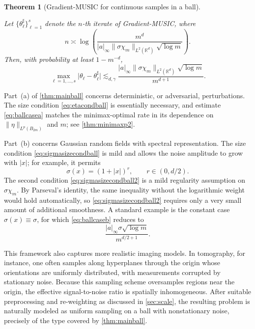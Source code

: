 \documentclass[11pt]{article}
\newtheorem{theorem}{Theorem}
\theoremstyle{definition}
\numberwithin{theorem}{section}
\numberwithin{lemma}{section}
\numberwithin{equation}{section}
\def\R{\mathbb{R}}
\newcommand{\bfa}{a}
\newcommand{\red}{\color{red}}
\numberwithin{equation}{section}
\begin{document}
\begin{theorem}[Gradient-MUSIC for continuous samples in a ball]
\begin{enumerate}[(a)]
Let $\{\theta_\ell^\sharp\}_{\ell=1}^s$ denote the $n$-th iterate of Gradient-MUSIC, where
\begin{equation}
\label{eq:ngraditerball2}
n\asymp
\log\!\left(
\frac{m^d}{|\bfa|_\infty \|\sigma\chi_m\|_{L^2(\R^d)}\sqrt{\log m}}
\right).
\end{equation}
Then, with probability at least $1-m^{-d}$,
\begin{equation}
\label{eq:ballcaseb}
\max_{\ell=1,\dots,s}
\bigl|\theta_\ell-\theta_\ell^\sharp\bigr|
\lesssim_{d,\gamma}
\frac{|\bfa|_\infty \|\sigma\chi_m\|_{L^2(\R^d)}\sqrt{\log m}}{m^{d+1}}.
\end{equation}
\end{enumerate}
\end{theorem}

Part~(a) of \cref{thm:mainball} concerns deterministic, or adversarial, perturbations. The size condition \eqref{eq:etacondball} is essentially necessary, and estimate \eqref{eq:ballcasea} matches the minimax-optimal rate in its dependence on $\|\eta\|_{L^p(B_{2m})}$ and $m$; see \cref{thm:minimaxp2}. 

Part~(b) concerns Gaussian random fields with spectral representation. The size condition \eqref{eq:sigmasizecondball} is mild and allows the noise amplitude to grow with $|x|$; for example, it permits
\[
\sigma(x)=(1+|x|)^r,
\qquad r\in(0,d/2).
\]
The second condition \eqref{eq:sigmasizecondball2} is a mild regularity assumption on $\sigma\chi_m$. By Parseval's identity, the same inequality without the logarithmic weight would hold automatically, so \eqref{eq:sigmasizecondball2} requires only a very small amount of additional smoothness. A standard example is the constant case $\sigma(x)\equiv \sigma$, for which \eqref{eq:ballcaseb} reduces to
\[
\frac{|\bfa|_\infty \sigma\sqrt{\log m}}{m^{d/2+1}}.
\]

This framework also captures more realistic imaging models. In tomography, for instance, one often samples along hyperplanes through the origin whose orientations are uniformly distributed, with measurements corrupted by stationary noise. Because this sampling scheme oversamples regions near the origin, the effective signal-to-noise ratio is spatially inhomogeneous. After suitable preprocessing { and re-weighting as discussed in \cref{sec:scale}}, the resulting problem is naturally modeled as uniform sampling on a ball with nonstationary noise, precisely of the type covered by \cref{thm:mainball}. %
\end{document}
